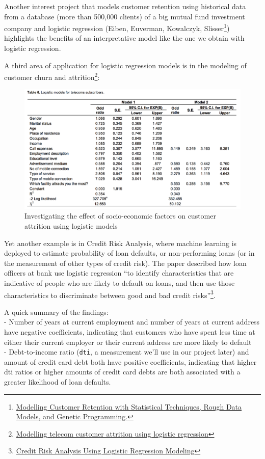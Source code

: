 \documentclass[
]{article}
\begin{document}
Another interest project that models customer retention using historical
data from a database (more than 500,000 clients) of a big mutual fund
investment company and logistic regression (Eiben, Euverman, Kowalczyk,
Slisser\footnote{\href{http://citeseerx.ist.psu.edu/viewdoc/download?doi=10.1.1.55.7177\&rep=rep1\&type=pdf}{Modelling
  Customer Retention with Statistical Techniques, Rough Data Models, and
  Genetic Programming.}}) highlights the benefits of an interpretative
model like the one we obtain with logistic regression.

A third area of application for logistic regression models is in the
modeling of customer churn and attrition\footnote{\href{http://www.academicjournals.org/article/article1379926496_Oghojafor\%20et\%20al.pdf}{Modelling
  telecom customer attrition using logistic regression}}:

\begin{figure}
\centering
\includegraphics{assets/illustration1.png}
\caption{Investigating the effect of socio-economic factors on customer
attrition using logistic models}
\end{figure}

Yet another example is in Credit Risk Analysis, where machine learning
is deployed to estimate probability of loan defaults, or non-performing
loans (or in the measurement of other types of credit risk). The paper
described how loan officers at bank use logistic regression ``to
identify characteristics that are indicative of people who are likely to
default on loans, and then use those characteristics to discriminate
between good and bad credit risks''\footnote{\href{http://smartdrill.com/pdf/Credit\%20Risk\%20Analysis.pdf}{Credit
  Risk Analysis Using Logistic Regression Modeling}}.

A quick summary of the findings:\\
- Number of years at current employment and number of years at current
address have negative coefficients, indicating that customers who have
spent less time at either their current employer or their current
address are more likely to default\\
- Debt-to-income ratio (\texttt{dti}, a measurement we'll use in our
project later) and amount of credit card debt both have positive
coefficients, indicating that higher dti ratios or higher amounts of
credit card debts are both associated with a greater likelihood of loan
defaults.
\end{document}
